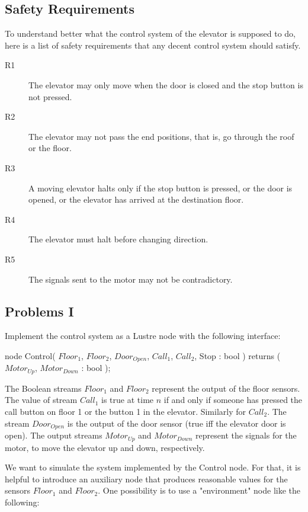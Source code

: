 \documentclass[11pt]{article}
\begin{document}
\subsection{Safety Requirements}

To understand better what the control system of the elevator is
supposed to do, here is a list of safety requirements that any decent
control system should satisfy.
\begin{description}
\item[R1] The elevator may only move when the door is closed and the
  stop button is not pressed.
\item[R2]	The elevator may not pass the end positions, that is, go through the roof or the floor.
\item[R3] A moving elevator halts only if the stop button is pressed,
  or the door is opened, or the elevator has arrived at the
  destination floor.
\item[R4]	The elevator must halt before changing direction.
\item[R5]	The signals sent to the motor may not be contradictory.
\end{description}


\subsection{Problems I}

Implement the control system as a Lustre node with the following interface:

\begin{lustre}
  node Control( $Floor_1$, $Floor_2$, $Door_{Open}$, $Call_1$, $Call_2$, Stop : bool )
  returns ( $Motor_{Up}$, $Motor_{Down}$ : bool );
\end{lustre}

The Boolean streams $Floor_1$ and $Floor_2$ represent the output of
the floor sensors. The value of stream $Call_1$ is true at time $n$ if
and only if someone has pressed the call button on floor 1 or the
button 1 in the elevator. Similarly for $Call_2$. The stream
$Door_{Open}$ is the output of the door sensor (true iff the elevator
door is open). The output streams $Motor_{Up}$ and $Motor_{Down}$
represent the signals for the motor, to move the elevator up and down,
respectively.

We want to simulate the system implemented by the Control node. For
that, it is helpful to introduce an auxiliary node that produces
reasonable values for the sensors $Floor_1$ and $Floor_2$.  One
possibility is to use a "environment" node like the following:
\end{document}
